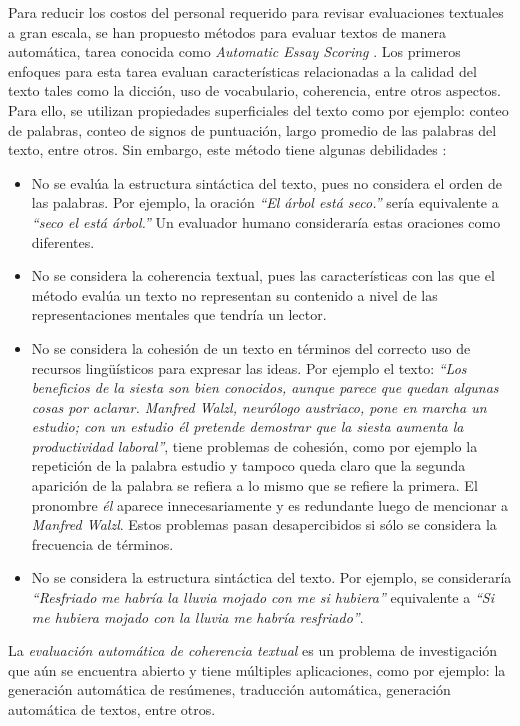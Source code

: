 \documentclass[12pt]{diicc}
\begin{document}
Para reducir los costos del personal requerido para revisar evaluaciones textuales a gran escala, se han propuesto métodos para evaluar textos de manera automática, tarea conocida como {\em Automatic Essay Scoring} \cite{t9}. Los primeros enfoques para esta tarea evaluan características relacionadas a la calidad del texto tales como la dicción, uso de vocabulario, coherencia, entre otros aspectos. Para ello, se utilizan propiedades superficiales del texto como por ejemplo: conteo de palabras, conteo de signos de puntuación, largo promedio de las palabras del texto, entre otros. Sin embargo, este método tiene algunas debilidades \cite{t24}\cite{t25}:

\begin{itemize}
	\item No se evalúa la estructura sintáctica del texto, pues no considera el orden de las palabras. Por ejemplo, la oración {\em ``El árbol está seco.''} sería equivalente a {\em ``seco el está árbol.''} Un evaluador humano consideraría estas oraciones como diferentes.
	\item No se considera la coherencia textual, pues las características con las que el método evalúa un texto no representan su contenido a nivel de las representaciones mentales que tendría un lector.
	\item No se considera la cohesión de un texto en términos del correcto uso de recursos lingüísticos para expresar las ideas. Por ejemplo el texto: {\em ``Los beneficios de la siesta son bien conocidos, aunque parece que quedan algunas cosas por aclarar. Manfred Walzl, neurólogo austriaco, pone en marcha un estudio; con un estudio él pretende demostrar que la siesta aumenta la productividad laboral''}, tiene problemas de cohesión, como por ejemplo la repetición de la palabra estudio y tampoco queda claro que la segunda aparición de la palabra se refiera a lo mismo que se refiere la primera. El pronombre {\em él} aparece innecesariamente y es redundante luego de mencionar a {\em Manfred Walzl}. Estos problemas pasan desapercibidos si sólo se considera la frecuencia de términos.
	\item No se considera la estructura sintáctica del texto. Por ejemplo, se consideraría {\em ``Resfriado me habría la lluvia mojado con me si hubiera''} equivalente a {\em ``Si me hubiera mojado con la lluvia me habría resfriado''}.
	
\end{itemize}

La {\em evaluación automática de coherencia textual} es un problema de investigación que aún se encuentra abierto y tiene múltiples aplicaciones, como por ejemplo: la generación automática de resúmenes, traducción automática, generación automática de textos, entre otros\cite{t33}\cite{t34}\cite{t35}. 
\end{document}
